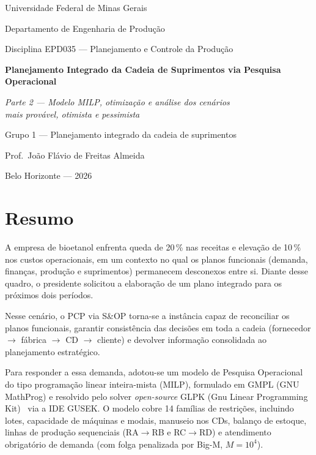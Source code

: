 \documentclass[11pt,a4paper]{article}
\begin{document}
\begin{titlepage}
  \centering
  \vspace*{1.5cm}
  {\small Universidade Federal de Minas Gerais\par
  Departamento de Engenharia de Produção\par
  Disciplina EPD035 — Planejamento e Controle da Produção\par}
  \vspace{2cm}
  {\Huge\bfseries Planejamento Integrado da Cadeia de Suprimentos via Pesquisa Operacional\par}
  \vspace{0.8cm}
  {\Large\itshape Parte 2 — Modelo MILP, otimização e análise dos cenários\\ mais provável, otimista e pessimista\par}
  \vfill
  {\large Grupo 1 — Planejamento integrado da cadeia de suprimentos\par}
  {\large Prof.\ João Flávio de Freitas Almeida\par}
  \vspace{1cm}
  {\large Belo Horizonte --- 2026\par}
\end{titlepage}

\tableofcontents
\newpage

\section*{Resumo}

A empresa de bioetanol enfrenta queda de 20\,\% nas receitas e elevação de 10\,\% nos custos operacionais, em um contexto no qual os planos funcionais (demanda, finanças, produção e suprimentos) permanecem desconexos entre si. Diante desse quadro, o presidente solicitou a elaboração de um plano integrado para os próximos dois períodos.

Nesse cenário, o PCP via S\&OP torna-se a instância capaz de reconciliar os planos funcionais, garantir consistência das decisões em toda a cadeia (fornecedor $\to$ fábrica $\to$ CD $\to$ cliente) e devolver informação consolidada ao planejamento estratégico.

Para responder a essa demanda, adotou-se um modelo de Pesquisa Operacional do tipo programação linear inteira-mista (MILP), formulado em GMPL (GNU MathProg) e resolvido pelo solver \emph{open-source} GLPK (Gnu Linear Programming Kit)~\cite{makhorin2015glpk} via a IDE GUSEK. O modelo cobre 14 famílias de restrições, incluindo lotes, capacidade de máquinas e modais, manuseio nos CDs, balanço de estoque, linhas de produção sequenciais (RA$\to$RB e RC$\to$RD) e atendimento obrigatório de demanda (com folga penalizada por Big-M, $M = 10^4$).
\end{document}
